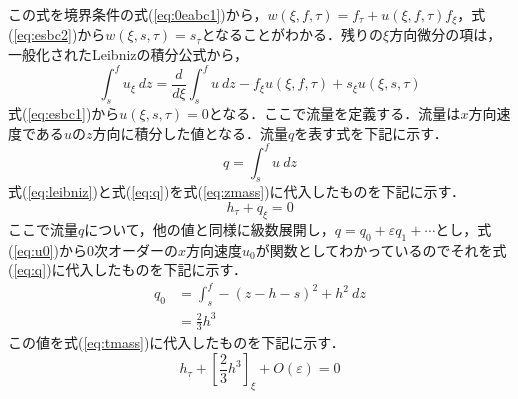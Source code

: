 \documentclass[autodetect-engine,dvipdfmx-if-dvi,ja=standard,a4paper,11pt]{bxjsarticle} %
\begin{document}
この式を境界条件の式(\ref{eq:0eabc1})から，$w(\xi,f,\tau)=f_\tau+u(\xi,f,\tau)f_\xi$，式(\ref{eq:esbc2})から$w(\xi,s,\tau)=s_\tau$となることがわかる．残りの$\xi$方向微分の項は，一般化されたLeibnizの積分公式から，
\begin{equation}
\int^{f}_{s}u_\xi\ dz=\frac{d}{d\xi}\int^{f}_{s}u\ dz-f_\xi u(\xi,f,\tau)+s_\xi u(\xi,s,\tau)\label{eq:leibniz}
\end{equation}
式(\ref{eq:esbc1})から$u(\xi,s,\tau)=0$となる．ここで流量を定義する．流量は$x$方向速度である$u$の$z$方向に積分した値となる．流量$q$を表す式を下記に示す．
\begin{equation}
q=\int^{f}_{s}u\ dz\label{eq:q}
\end{equation}
式(\ref{eq:leibniz})と式(\ref{eq:q})を式(\ref{eq:zmass})に代入したものを下記に示す．
\begin{equation}
h_\tau+q_\xi=0\label{eq:tmass}
\end{equation}
\　ここで流量$q$について，他の値と同様に級数展開し，$q=q_0+\varepsilon q_1+\cdots$とし，式(\ref{eq:u0})から0次オーダーの$x$方向速度$u_0$が関数としてわかっているのでそれを式(\ref{eq:q})に代入したものを下記に示す．
\begin{equation}
\begin{split}
q_0&=\int^{f}_{s}-(z-h-s)^2+h^2\ dz\\
&=\frac{2}{3}h^3
\label{eq:q0}
\end{split}
\end{equation}
この値を式(\ref{eq:tmass})に代入したものを下記に示す．
\begin{equation}
h_\tau+\left[\frac{2}{3}h^3\right]_\xi+O(\varepsilon)=0\label{eq:qtmass}
\end{equation}
\end{document}
